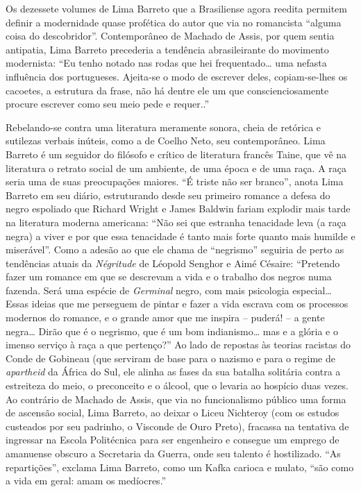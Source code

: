 \documentclass[
  letterpaper,
  DIV=11,
  numbers=noendperiod]{scrreprt}
\begin{document}
Os dezessete volumes de Lima Barreto que a Brasiliense agora reedita
permitem definir a modernidade quase profética do autor que via no
romancista ``alguma coisa do descobridor''. Contemporâneo de Machado de
Assis, por quem sentia antipatia, Lima Barreto precederia a tendência
abrasileirante do movimento modernista: ``Eu tenho notado nas rodas que
hei frequentado\ldots{} uma nefasta influência dos portugueses.
Ajeita-se o modo de escrever deles, copiam-se-lhes os cacoetes, a
estrutura da frase, não há dentre ele um que conscienciosamente procure
escrever como seu meio pede e requer..''

Rebelando-se contra uma literatura meramente sonora, cheia de retórica e
sutilezas verbais inúteis, como a de Coelho Neto, seu contemporâneo.
Lima Barreto é um seguidor do filósofo e crítico de literatura francês
Taine, que vê na literatura o retrato social de um ambiente, de uma
época e de uma raça. A raça seria uma de suas preocupações maiores. ``É
triste não ser branco'', anota Lima Barreto em seu diário, estruturando
desde seu primeiro romance a defesa do negro espoliado que Richard
Wright e James Baldwin fariam explodir mais tarde na literatura moderna
americana: ``Não sei que estranha tenacidade leva (a raça negra) a viver
e por que essa tenacidade é tanto mais forte quanto mais humilde e
miserável''. Como a adesão ao que ele chama de ``negrismo'' seguiria de
perto as tendências atuais da \emph{Négritude} de Léopold Senghor e Aimé
Césaire: ``Pretendo fazer um romance em que se descrevam a vida e o
trabalho dos negros numa fazenda. Será uma espécie de \emph{Germinal}
negro, com mais psicologia especial\ldots{} Essas ideias que me
perseguem de pintar e fazer a vida escrava com os processos modernos do
romance, e o grande amor que me inspira -- puderá! -- a gente
negra\ldots{} Dirão que é o negrismo, que é um bom indianismo\ldots{}
mas e a glória e o imenso serviço à raça a que pertenço?'' Ao lado de
repostas às teorias racistas do Conde de Gobineau (que serviram de base
para o nazismo e para o regime de \emph{apartheid} da África do Sul, ele
alinha as fases da sua batalha solitária contra a estreiteza do meio, o
preconceito e o álcool, que o levaria ao hospício duas vezes. Ao
contrário de Machado de Assis, que via no funcionalismo público uma
forma de ascensão social, Lima Barreto, ao deixar o Liceu Nichteroy (com
os estudos custeados por seu padrinho, o Visconde de Ouro Preto),
fracassa na tentativa de ingressar na Escola Politécnica para ser
engenheiro e consegue um emprego de amanuense obscuro a Secretaria da
Guerra, onde seu talento é hostilizado. ``As repartições'', exclama Lima
Barreto, como um Kafka carioca e mulato, ``são como a vida em geral:
amam os medíocres.''
\end{document}
